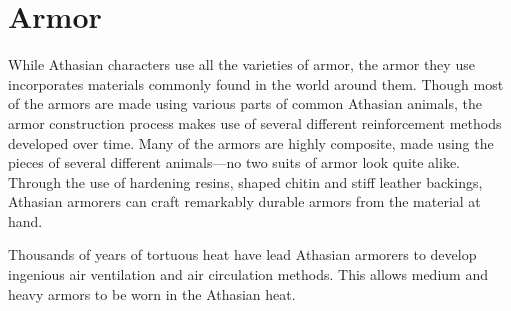 \section{Armor}
While Athasian characters use all the varieties of armor, the armor they use incorporates materials commonly found in the world around them. Though most of the armors are made using various parts of common Athasian animals, the armor construction process makes use of several different reinforcement methods developed over time. Many of the armors are highly composite, made using the pieces of several different animals---no two suits of armor look quite alike. Through the use of hardening resins, shaped chitin and stiff leather backings, Athasian armorers can craft remarkably durable armors from the material at hand.

Thousands of years of tortuous heat have lead Athasian armorers to develop ingenious air ventilation and air circulation methods. This allows medium and heavy armors to be worn in the Athasian heat.


